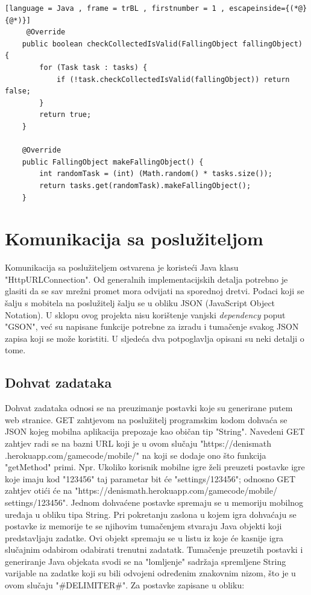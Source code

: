 \documentclass[times, utf8, zavrsni]{fer}
\begin{document}
	\begin{lstlisting}[language = Java , frame = trBL , firstnumber = 1 , escapeinside={(*@}{@*)}]
	 @Override
    public boolean checkCollectedIsValid(FallingObject fallingObject) {
        for (Task task : tasks) {
            if (!task.checkCollectedIsValid(fallingObject)) return false;
        }
        return true;
    }

    @Override
    public FallingObject makeFallingObject() {
        int randomTask = (int) (Math.random() * tasks.size());
        return tasks.get(randomTask).makeFallingObject();
    }
	\end{lstlisting}
	
	\section{Komunikacija sa poslužiteljom}
	Komunikacija sa poslužiteljem ostvarena je koristeći Java klasu "HttpURLConnection". Od generalnih implementacijskih detalja potrebno je glasiti da se sav mrežni promet mora odvijati na sporednoj dretvi. 
	Podaci koji se šalju s mobitela na poslužitelj šalju se u obliku JSON (JavaScript Object Notation). U sklopu ovog projekta nisu korištenje vanjski \textit{dependency} poput "GSON", već
	su napisane funkcije potrebne za izradu i tumačenje svakog JSON zapisa koji se može koristiti. U sljedeća dva potpoglavlja opisani su neki detalji o tome.
	\subsection{Dohvat zadataka}
	Dohvat zadataka odnosi se na preuzimanje postavki koje su generirane putem web stranice. GET zahtjevom na poslužitelj programskim kodom dohvaća se JSON kojeg mobilna aplikacija prepozaje kao običan tip "String".
	Navedeni GET zahtjev radi se na bazni URL koji je u ovom slučaju "https://denismath .herokuapp.com/gamecode/mobile/" na koji se dodaje ono što funkcija "getMethod" primi. Npr. Ukoliko korisnik mobilne igre želi preuzeti postavke
	igre koje imaju kod "123456"  taj parametar bit će "settings/123456"; odnosno GET zahtjev otići će na "https://denismath.herokuapp.com/gamecode/mobile/ settings/123456".
	Jednom dohvaćene postavke spremaju se u memoriju mobilnog uređaja u obliku tipa String. Pri pokretanju zaslona u kojem igra dohvaćaju se postavke iz memorije te se njihovim tumačenjem stvaraju Java objekti koji predstavljaju zadatke.
	Ovi objekt spremaju se u listu iz koje će kasnije igra slučajnim odabirom odabirati trenutni zadatatk. Tumačenje preuzetih postavki i generiranje Java objekata svodi se na "lomljenje" sadržaja spremljene String varijable
	na zadatke koji su bili odvojeni određenim znakovnim nizom, što je u ovom slučaju "\#DELIMITER\#".
	Za postavke zapisane u obliku:
	
\end{document}
